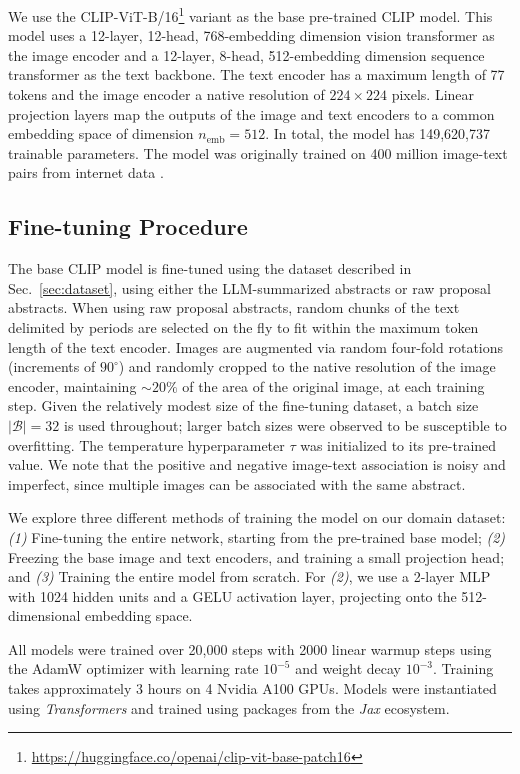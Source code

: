 \documentclass[10pt]{article} %
\newcommand{\package}[1]{\textsl{#1}\xspace}
\begin{document}
We use the CLIP-ViT-B/16\footnote{\url{https://huggingface.co/openai/clip-vit-base-patch16}} \citep{radford2021learning} variant as the base pre-trained CLIP model.
%
This model uses a 12-layer, 12-head, 768-embedding dimension vision transformer as the image encoder and a 12-layer, 8-head, 512-embedding dimension sequence transformer as the text backbone.
%
The text encoder has a maximum length of 77 tokens and the image encoder a native resolution of $224\times224$ pixels.
%
Linear projection layers map the outputs of the image and text encoders to a common embedding space of dimension $n_\text{emb}=512$.
%
In total, the model has 149,620,737 trainable parameters.
%
The model was originally trained on 400 million image-text pairs from internet data \citep{radford2021learning}.
%

\subsection{Fine-tuning Procedure}

The base CLIP model is fine-tuned using the dataset described in Sec.~\ref{sec:dataset}, using either the LLM-summarized abstracts or raw proposal abstracts.
%
When using raw proposal abstracts, random chunks of the text delimited by periods are selected on the fly to fit within the maximum token length of the text encoder.
%
Images are augmented via random four-fold rotations (increments of $90^\circ$) and randomly cropped to the native resolution of the image encoder, maintaining $\sim 20\%$ of the area of the original image, at each training step.
%
Given the relatively modest size of the fine-tuning dataset, a batch size $|\mathcal B| = 32$ is used throughout; larger batch sizes were observed to be susceptible to overfitting.
%
The temperature hyperparameter $\tau$ was initialized to its pre-trained value.
%
We note that the positive and negative image-text association is noisy and imperfect, since multiple images can be associated with the same abstract. 

We explore three different methods of training the model on our domain dataset: \emph{(1)} Fine-tuning the entire network, starting from the pre-trained base model; \emph{(2)} Freezing the base image and text encoders, and training a small projection head; and \emph{(3)} Training the entire model from scratch.
%
For \emph{(2)}, we use a 2-layer MLP with 1024 hidden units and a GELU activation layer, projecting onto the 512-dimensional embedding space.

All models were trained over 20,000 steps with 2000 linear warmup steps 
using the AdamW optimizer \citep{DBLP:conf/iclr/LoshchilovH19,DBLP:journals/corr/KingmaB14} with  %
learning rate $10^{-5}$ and weight decay $10^{-3}$.
%
Training takes approximately 3 hours on 4 Nvidia A100 GPUs.
Models were instantiated using \package{Transformers} \citep{wolf2019huggingface} and trained using packages from the \package{Jax} \citep{jax2018github} ecosystem.
%
\end{document}

